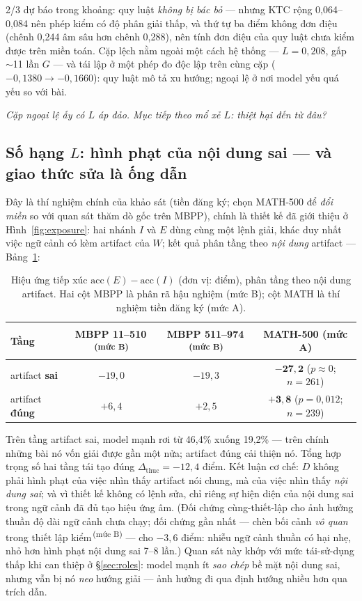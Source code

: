 \documentclass[11pt,a4paper]{article}
\newcommand{\mucB}{\textsuperscript{\,(mức B)}}
\newcommand{\dhonest}{\Delta_{\mathrm{thuc}}}
\newcommand{\acc}{\mathrm{acc}}
\begin{document}
2/3 dự báo trong khoảng: quy luật \emph{không bị bác bỏ} --- nhưng KTC rộng 0,064--0,084 nên
phép kiểm có độ phân giải thấp, và thứ tự ba điểm không đơn điệu (chênh 0,244 âm sâu hơn chênh
0,288), nên tính đơn điệu của quy luật chưa kiểm được trên miền toán. Cặp lệch nằm ngoài một
cách hệ thống --- $L = 0{,}208$, gấp $\sim$11 lần $G$ --- và tái lập ở một phép đo độc lập trên
cùng cặp ($-0{,}1380 \to -0{,}1660$): quy luật mô tả xu hướng; ngoại lệ ở nơi model yếu quá yếu
so với bài.

\emph{Cặp ngoại lệ ấy có $L$ áp đảo. Mục tiếp theo mổ xẻ $L$: thiệt hại đến từ đâu?}

\subsection{Số hạng $L$: hình phạt của nội dung sai --- và giao thức sửa là ống dẫn}\label{sec:termL}

Đây là thí nghiệm chính của khảo sát (tiền đăng ký; chọn MATH-500 để \emph{đổi miền} so với
quan sát thăm dò gốc trên MBPP), chính là thiết kế đã giới thiệu ở Hình~\ref{fig:exposure}:
hai nhánh $I$ và $E$ dùng cùng một lệnh giải, khác duy nhất việc ngữ cảnh có kèm artifact của
$W$; kết quả phân tầng theo \emph{nội dung} artifact --- Bảng~\ref{tab:exposure}:

\begin{table}[t]\centering\small
\begin{tabular}{lccc}\toprule
Tầng & MBPP 11--510\mucB & MBPP 511--974\mucB & \textbf{MATH-500 (mức A)}\\\midrule
artifact \textbf{sai}  & $-19{,}0$ & $-19{,}3$ & $\mathbf{-27{,}2}$ ($p\approx 0$; $n=261$)\\
artifact \textbf{đúng} & $+6{,}4$ & $+2{,}5$ & $\mathbf{+3{,}8}$ ($p=0{,}012$; $n=239$)\\\bottomrule
\end{tabular}
\caption{Hiệu ứng tiếp xúc $\acc(E)-\acc(I)$ (đơn vị: điểm), phân tầng theo nội dung artifact.
Hai cột MBPP là phân rã hậu nghiệm (mức B); cột MATH là thí nghiệm tiền đăng ký (mức A).}
\label{tab:exposure}
\end{table}

Trên tầng artifact sai, model mạnh rơi từ 46,4\% xuống 19,2\% --- trên chính những bài nó vốn
giải được gần một nửa; artifact đúng cải thiện nó. Tổng hợp trọng số hai tầng tái tạo đúng
$\dhonest = -12{,}4$ điểm. Kết luận cơ chế: $D$ không phải hình phạt của việc nhìn thấy
artifact nói chung, mà của việc nhìn thấy \emph{nội dung sai}; và vì thiết kế không có lệnh
sửa, chỉ riêng sự hiện diện của nội dung sai trong ngữ cảnh đã đủ tạo hiệu ứng âm. (Đối chứng
cùng-thiết-lập cho ảnh hưởng thuần độ dài ngữ cảnh chưa chạy; đối chứng gần nhất --- chèn bối
cảnh \emph{vô quan} trong thiết lập kiểm\mucB{} --- cho $-3{,}6$ điểm: nhiễu ngữ cảnh thuần có
hại nhẹ, nhỏ hơn hình phạt nội dung sai 7--8 lần.) Quan sát này khớp với mức tái-sử-dụng thấp khi can thiệp
ở \S\ref{sec:roles}: model mạnh ít \emph{sao chép} bề mặt nội dung sai, nhưng vẫn bị nó
\emph{neo} hướng giải --- ảnh hưởng đi qua định hướng nhiều hơn qua trích dẫn.
\end{document}
